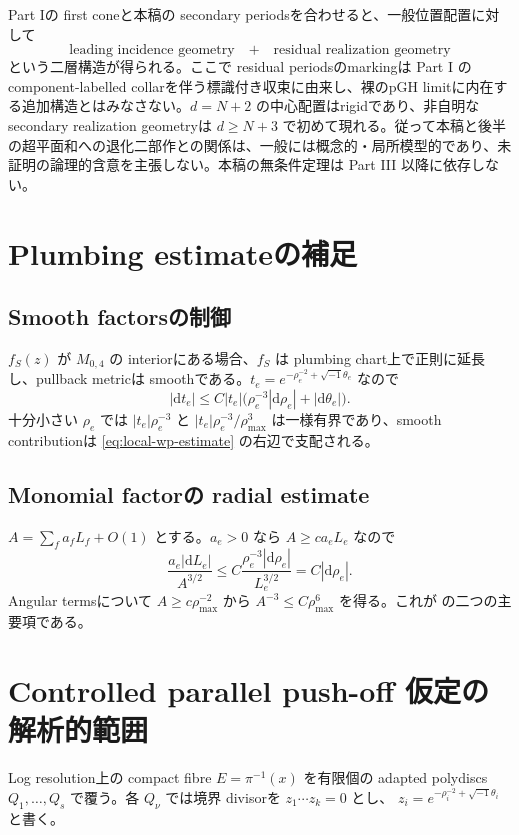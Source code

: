 \documentclass[11pt,a4paper]{ltjsarticle}
\newcommand{\dd}{\mathrm d}
\theoremstyle{plain}
\theoremstyle{definition}
\theoremstyle{remark}
\begin{document}
Part Iの first coneと本稿の secondary periodsを合わせると、一般位置配置に対して
\[
 \text{leading incidence geometry}
 \quad+\quad
 \text{residual realization geometry}
\]
という二層構造が得られる。ここで residual periodsのmarkingは Part I のcomponent-labelled collarを伴う標識付き収束に由来し、裸のpGH limitに内在する追加構造とはみなさない。$d=N+2$ の中心配置はrigidであり、非自明なsecondary realization geometryは $d\ge N+3$ で初めて現れる。従って本稿と後半の超平面和への退化二部作との関係は、一般には概念的・局所模型的であり、未証明の論理的含意を主張しない。本稿の無条件定理は Part III 以降に依存しない。

\appendix
\section{Plumbing estimateの補足}
\label{app:plumbing}

\subsection{Smooth factorsの制御}
$f_S(z)$ が $M_{0,4}$ の interiorにある場合、$f_S$ は plumbing chart上で正則に延長し、pullback metricは smoothである。$t_e=e^{-\rho_e^{-2}+\sqrt{-1}\theta_e}$ なので
\[
 |\dd t_e|
 \le C|t_e|\bigl(\rho_e^{-3}|\dd\rho_e|+|\dd\theta_e|\bigr).
\]
十分小さい $\rho_e$ では $|t_e|\rho_e^{-3}$ と $|t_e|\rho_e^{-3}/\rho_{\max}^3$ は一様有界であり、smooth contributionは \eqref{eq:local-wp-estimate} の右辺で支配される。

\subsection{Monomial factorの radial estimate}
$A=\sum_fa_fL_f+O(1)$ とする。$a_e>0$ なら $A\ge c a_eL_e$ なので
\[
 \frac{a_e|\dd L_e|}{A^{3/2}}
 \le C\frac{\rho_e^{-3}|\dd\rho_e|}{L_e^{3/2}}
 =C|\dd\rho_e|.
\]
Angular termsについて $A\ge c\rho_{\max}^{-2}$ から $A^{-3}\le C\rho_{\max}^{6}$ を得る。これが  の二つの主要項である。

\section{Controlled parallel push-off 仮定の解析的範囲}
\label{app:finite-map-collapse}

Log resolution上の compact fibre $E=\pi^{-1}(x)$ を有限個の adapted polydiscs $Q_1,\ldots,Q_s$ で覆う。各 $Q_\nu$ では境界 divisorを $z_1\cdots z_k=0$ とし、
$z_i=e^{-\rho_i^{-2}+\sqrt{-1}\theta_i}$ と書く。
\end{document}
